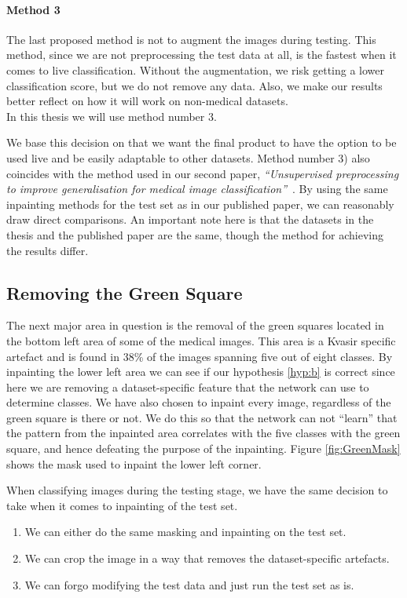 \paragraph{Method 3}
The last proposed method is not to augment the images during testing. This method, since we are not preprocessing the test data at all, is the fastest when it comes to live classification. Without the augmentation, we risk getting a lower classification score, but we do not remove any data. Also, we make our results better reflect on how it will work on non-medical datasets.\\

\noindent
In this thesis we will use method number 3. 

We base this decision on that we want the final product to have the option to be used live and be easily adaptable to other datasets. 
Method number 3) also coincides with the method used in our second paper, \textit{``Unsupervised preprocessing to improve generalisation for medical image classification''}~\cite{Mathias2019IEEpaper}. By using the same inpainting methods for the test set as in our published paper, we can reasonably draw direct comparisons.
An important note here is that the datasets in the thesis and the published paper are the same, though the method for achieving the results differ.


\subsection{Removing the Green Square}
The next major area in question is the removal of the green squares located in the bottom left area of some of the medical images.  This area is a Kvasir specific artefact and is found in 38\% of the images spanning five out of eight classes. 
By inpainting the lower left area we can see if our hypothesis \ref{hyp:b} is correct since here we are removing a dataset-specific feature that the network can use to determine classes. 
We have also chosen to inpaint every image, regardless of the green square is there or not. We do this so that the network can not ``learn'' that the pattern from the inpainted area correlates with the five classes with the green square, and hence defeating the purpose of the inpainting. Figure \ref{fig:GreenMask} shows the mask used to inpaint the lower left corner.

When classifying images during the testing stage, we have the same decision to take when it comes to inpainting of the test set.
\begin{enumerate}
\item We can either do the same masking and inpainting on the test set. 
\item We can crop the image in a way that removes the dataset-specific artefacts.
\item We can forgo modifying the test data and just run the test set as is. 
\end{enumerate}

